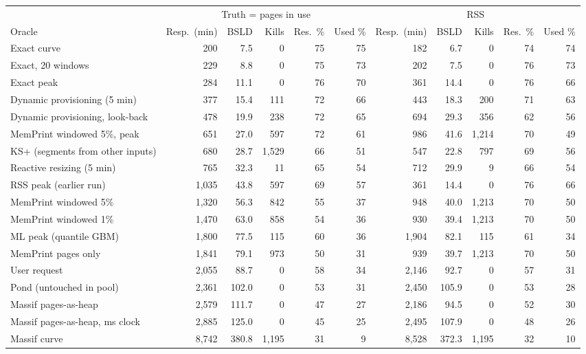 \begin{tabular}{lrrrrrrrrrr}
\toprule
 & \multicolumn{5}{c}{Truth = pages in use} & \multicolumn{5}{c}{RSS} \\
\cmidrule(lr){2-6} \cmidrule(lr){7-11}
Oracle & Resp.\ (min) & BSLD & Kills & Res.\ \% & Used \% & Resp.\ (min) & BSLD & Kills & Res.\ \% & Used \% \\
\midrule
Exact curve & 200 & 7.5 & 0 & 75 & 75 & 182 & 6.7 & 0 & 74 & 74 \\
Exact, 20 windows & 229 & 8.8 & 0 & 75 & 73 & 202 & 7.5 & 0 & 76 & 73 \\
Exact peak & 284 & 11.1 & 0 & 76 & 70 & 361 & 14.4 & 0 & 76 & 66 \\
Dynamic provisioning (5 min) & 377 & 15.4 & 111 & 72 & 66 & 443 & 18.3 & 200 & 71 & 63 \\
Dynamic provisioning, look-back & 478 & 19.9 & 238 & 72 & 65 & 694 & 29.3 & 356 & 62 & 56 \\
MemPrint windowed 5\%, peak & 651 & 27.0 & 597 & 72 & 61 & 986 & 41.6 & 1{,}214 & 70 & 49 \\
KS+ (segments from other inputs) & 680 & 28.7 & 1{,}529 & 66 & 51 & 547 & 22.8 & 797 & 69 & 56 \\
Reactive resizing (5 min) & 765 & 32.3 & 11 & 65 & 54 & 712 & 29.9 & 9 & 66 & 54 \\
RSS peak (earlier run) & 1{,}035 & 43.8 & 597 & 69 & 57 & 361 & 14.4 & 0 & 76 & 66 \\
MemPrint windowed 5\% & 1{,}320 & 56.3 & 842 & 55 & 37 & 948 & 40.0 & 1{,}213 & 70 & 50 \\
MemPrint windowed 1\% & 1{,}470 & 63.0 & 858 & 54 & 36 & 930 & 39.4 & 1{,}213 & 70 & 50 \\
ML peak (quantile GBM) & 1{,}800 & 77.5 & 115 & 60 & 36 & 1{,}904 & 82.1 & 115 & 61 & 34 \\
MemPrint pages only & 1{,}841 & 79.1 & 973 & 50 & 31 & 939 & 39.7 & 1{,}213 & 70 & 50 \\
User request & 2{,}055 & 88.7 & 0 & 58 & 34 & 2{,}146 & 92.7 & 0 & 57 & 31 \\
Pond (untouched in pool) & 2{,}361 & 102.0 & 0 & 53 & 31 & 2{,}450 & 105.9 & 0 & 53 & 28 \\
Massif pages-as-heap & 2{,}579 & 111.7 & 0 & 47 & 27 & 2{,}186 & 94.5 & 0 & 52 & 30 \\
Massif pages-as-heap, ms clock & 2{,}885 & 125.0 & 0 & 45 & 25 & 2{,}495 & 107.9 & 0 & 48 & 26 \\
Massif curve & 8{,}742 & 380.8 & 1{,}195 & 31 & 9 & 8{,}528 & 372.3 & 1{,}195 & 32 & 10 \\

\end{tabular}
